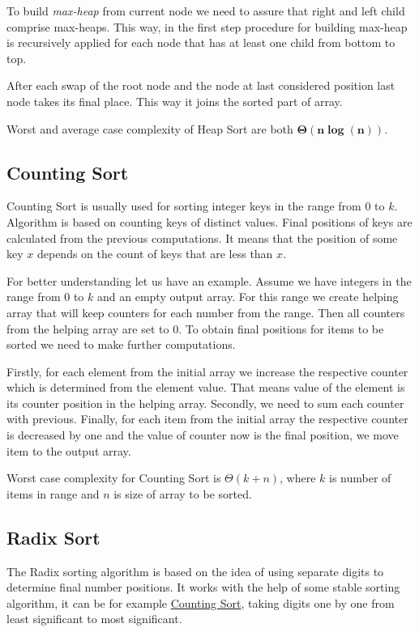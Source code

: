 \documentclass[
  field=inf,
  biblatex,
  language=english,
  glossaries,
  index
]{kidiplom}
\begin{document}
To build \textit{max-heap} from current node we need to assure that right and left child comprise max-heaps. This way, in the first step procedure for building max-heap is recursively applied for each node that has at least one child from bottom to top.

After each swap of the root node and the node at last considered position last node takes its final place. This way it joins the sorted part of array.

Worst and average case complexity of Heap Sort are both $\bm{\Theta(n \log(n))}$.

\subsection{Counting Sort} \label{sec:counting}

Counting Sort is usually used for sorting integer keys in the range from $0$ to $k$. Algorithm is based on counting keys of distinct values. Final positions of keys are calculated from the previous computations. It means that the position of some key $x$ depends on the count of keys that are less than $x$.

For better understanding let us have an example. Assume we have integers in the range from $0$ to $k$ and an empty output array. For this range we create helping array that will keep counters for each number from the range. Then all counters from the helping array are set to $0$. To obtain final positions for items to be sorted we need to make further computations.

Firstly, for each element from the initial array we increase the respective counter which is determined from the element value. That means value of the element is its counter position in the helping array. Secondly, we need to sum each counter with previous. Finally, for each item from the initial array the respective counter is decreased by one and the value of counter now is the final position, we move item to the output array.

Worst case complexity for Counting Sort is $\Theta(k + n)$, where $k$ is number of items in range and $n$ is size of array to be sorted.

\subsection{Radix Sort}

The Radix sorting algorithm is based on the idea of using separate digits to determine final number positions. It works with the help of some stable sorting algorithm, it can be for example \hyperref[sec:counting]{Counting Sort}, taking digits one by one from least significant to most significant.
\end{document}
